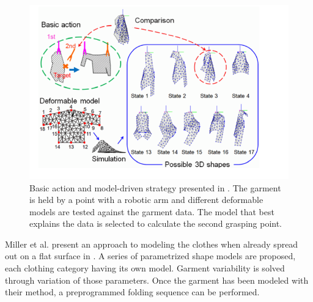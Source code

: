 \begin{figure}[thpb]
    \centering
    \includegraphics[width=0.95
    \textwidth]{figures/SOTA_Kita_2009.png}
    \caption[Basic action and model-driven strategy presented by Kita et al.]{Basic action and model-driven strategy presented in \cite{Kita2009}. The garment is held by a point with a robotic arm and different deformable models are tested against the garment data. The model that best explains the data is selected to calculate the second grasping point. }
    \label{fig:SOTA_Kita_2009}
\end{figure}

Miller et al. present an approach to modeling the clothes when already spread out on a flat surface in \cite{Miller2011}. A series of parametrized shape models are proposed, each clothing category having its own model. Garment variability is solved through variation of those parameters. Once the garment has been modeled with their method, a preprogrammed folding sequence can be performed.


